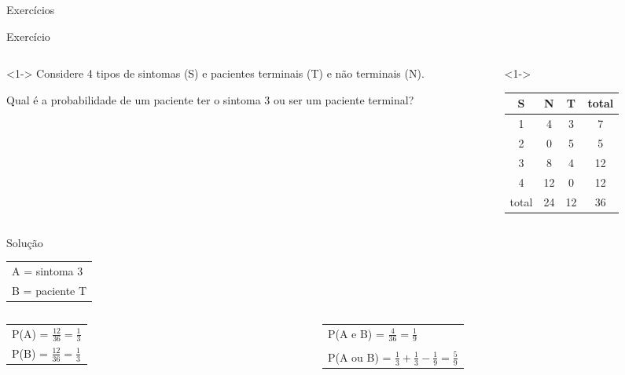 \documentclass{beamer}
\begin{document}
\begin{frame}{Exercícios}
  \begin{block}{Exercício}
    \begin{columns}
      \begin{column}{5cm}<1->
        Considere 4 tipos de sintomas (S) e pacientes terminais (T) e não
        terminais (N). 

        Qual é a probabilidade de um paciente ter o sintoma 3 ou ser um
        paciente terminal?
      \end{column}
      \begin{column}{5cm}<1->
        \begin{tabular}{ccc|c}
          S & N & T & total\\
          \hline
          1 & 4 & 3 & 7\\
          2 & 0 & 5 & 5\\
          3 & 8 & 4 & 12\\
          4 & 12 & 0 & 12\\
          \hline
          total & 24 & 12 & 36\\
        \end{tabular}
      \end{column}
    \end{columns}
  \end{block}
  \begin{block}{Solução}
    \begin{tabular}{l}
      A = sintoma 3\\
      B = paciente T\\
    \end{tabular}
    \begin{columns}
      \begin{column}{5cm}
        \begin{tabular}{l}
          P(A) = $\frac{12}{36} = \frac{1}{3}$\\
          P(B) = $\frac{12}{36} = \frac{1}{3}$\\
        \end{tabular}
      \end{column}
      \begin{column}{5cm}
        \begin{tabular}{l}
          P(A e B) = $\frac{4}{36} = \frac{1}{9}$\\
          \\
          P(A ou B) = $\frac{1}{3} + \frac{1}{3} - \frac{1}{9} = \frac{5}{9}$\\
        \end{tabular}
      \end{column}
    \end{columns}
  \end{block}
\end{frame}
\end{document}
